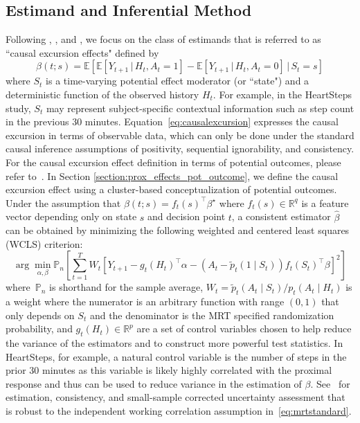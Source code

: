 \documentclass[12pt]{article}
\def\E{\mathbb{E}}
\def\given{\, | \,}
\begin{document}
\subsection{Estimand and Inferential Method}
\label{section:standardmrtmethods}

Following \cite{Boruvkaetal}, \cite{Qian2021}, and \cite{DempseyAOAS}, we focus on the class of estimands that is referred to as ``causal excursion effects" defined by
\begin{equation}
\label{eq:causalexcursion}
\beta (t;s) = \E \left[ \E \left[ Y_{t+1} \given H_t, A_t = 1 \right] - \E \left[ Y_{t+1} \given H_t, A_t = 0 \right] \given S_t = s\right]
\end{equation}
where $S_t$ is a time-varying potential effect moderator (or ``state") and a deterministic function of the observed history $H_t$. For example, in the HeartSteps study, $S_t$ may represent subject-specific contextual information such as step count in the previous 30 minutes.
Equation~\eqref{eq:causalexcursion} expresses the causal excursion in terms of observable data, which can only be done under the standard causal inference assumptions of positivity, sequential ignorability, and consistency. For the causal excursion effect definition in terms of potential outcomes, please refer to~\cite{Boruvkaetal}.  In Section \ref{section:prox_effects_pot_outcome}, we define the causal excursion effect using a cluster-based conceptualization of potential outcomes.  Under the assumption that $\beta(t;s) = f_t(s)^\top \beta^\star$ where $f_t(s) \in \mathbb{R}^q$ is a feature vector depending only on state $s$ and decision point $t$, a consistent estimator $\hat \beta$ can be obtained by minimizing the following weighted and centered least squares (WCLS) criterion:
\begin{equation}
\label{eq:mrtstandard}
\arg \min_{\alpha, \beta} \mathbb{P}_n \left[ \sum_{t=1}^T W_t \left[ Y_{t+1} - g_t(H_t)^\top \alpha - \left ( A_t - \tilde p_t (1 \mid S_t) \right) f_t (S_t)^\top \beta \right]^2 \right]
\end{equation}
where~$\mathbb{P}_n$ is shorthand for the sample average, $W_t = \tilde p_t (A_t \mid S_t) / p_t (A_t \mid H_t)$ is a weight where the numerator is an arbitrary function with range $(0,1)$ that only depends on $S_t$ and the denominator is the MRT specified randomization probability, and $g_t(H_t) \in \mathbb{R}^p$ are a set of control variables chosen to help reduce the variance of the estimators and to construct more powerful test statistics. In HeartSteps, for example, a natural control variable is the number of steps in the prior 30 minutes as this variable is likely highly correlated with the proximal response and thus can be used to reduce variance in the estimation of $\beta$. See~\cite{Boruvkaetal} for estimation, consistency, and small-sample corrected uncertainty assessment that is robust to the independent working correlation assumption in~\eqref{eq:mrtstandard}.
\end{document}
